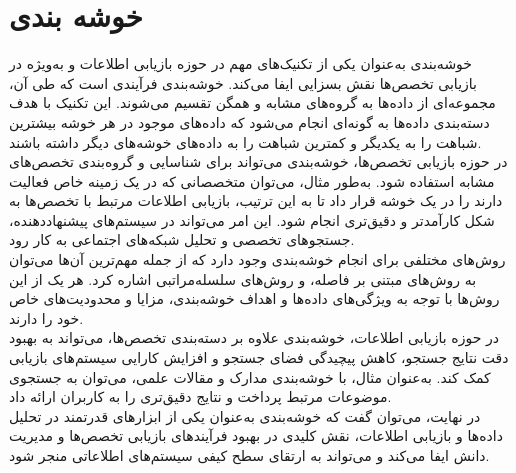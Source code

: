 \section{خوشه بندی}
\hspace*{2em}
خوشه‌بندی به‌عنوان یکی از تکنیک‌های مهم در حوزه بازیابی اطلاعات و به‌ویژه در بازیابی تخصص‌ها نقش 	بسزایی ایفا می‌کند. خوشه‌بندی فرآیندی است که طی آن، مجموعه‌ای از داده‌ها به گروه‌های مشابه و همگن تقسیم می‌شوند. این تکنیک با هدف دسته‌بندی داده‌ها به گونه‌ای انجام می‌شود که داده‌های موجود در هر خوشه بیشترین شباهت را به یکدیگر و کمترین شباهت را به داده‌های خوشه‌های دیگر داشته باشند.
\\
در حوزه بازیابی تخصص‌ها، خوشه‌بندی می‌تواند برای شناسایی و گروه‌بندی تخصص‌های مشابه استفاده شود. به‌طور مثال، می‌توان متخصصانی که در یک زمینه خاص فعالیت دارند را در یک خوشه قرار داد تا به این ترتیب، بازیابی اطلاعات مرتبط با تخصص‌ها به شکل کارآمدتر و دقیق‌تری انجام شود. این امر می‌تواند در سیستم‌های پیشنهاددهنده، جستجوهای تخصصی و تحلیل شبکه‌های اجتماعی به کار رود.
\\
روش‌های مختلفی برای انجام خوشه‌بندی وجود دارد که از جمله مهم‌ترین آن‌ها می‌توان به روش‌های مبتنی بر فاصله، و روش‌های سلسله‌مراتبی اشاره کرد. هر یک از این روش‌ها با توجه به ویژگی‌های داده‌ها و اهداف خوشه‌بندی، مزایا و محدودیت‌های خاص خود را دارند.
\\
در حوزه بازیابی اطلاعات، خوشه‌بندی علاوه بر دسته‌بندی تخصص‌ها، می‌تواند به بهبود دقت نتایج جستجو، کاهش پیچیدگی فضای جستجو و افزایش کارایی سیستم‌های بازیابی کمک کند. به‌عنوان مثال، با خوشه‌بندی مدارک و مقالات علمی، می‌توان به جستجوی موضوعات مرتبط پرداخت و نتایج دقیق‌تری را به کاربران ارائه داد.
\\
در نهایت، می‌توان گفت که خوشه‌بندی به‌عنوان یکی از ابزارهای قدرتمند در تحلیل داده‌ها و بازیابی اطلاعات، نقش کلیدی در بهبود فرآیندهای بازیابی تخصص‌ها و مدیریت دانش ایفا می‌کند و می‌تواند به ارتقای سطح کیفی سیستم‌های اطلاعاتی منجر شود.


